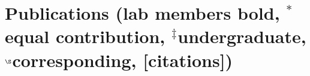 \documentclass[letterpaper,10pt]{article}
\begin{document}
\begin{itemize}

\end{itemize}

\section*{Publications {\small(lab members bold, $^*$equal contribution, $^\ddagger$undergraduate, $^\S$corresponding, [citations])}}

\end{document}
